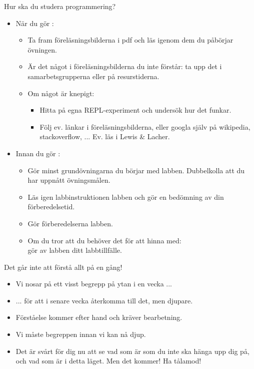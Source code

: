 \begin{SlideExtra}{Hur ska du studera programmering?}
\begin{itemize}
\item När du gör :
\begin{itemize}
\item Ta fram föreläsningsbilderna i pdf och läs igenom dem  du påbörjar övningen.
\item Är det något i föreläsningsbilderna du inte förstår: ta upp det i samarbetsgrupperna eller på resurstiderna.
\item Om något är knepigt:
\begin{itemize}
\item Hitta på egna REPL-experiment och undersök hur det funkar.
\item Följ ev. länkar i föreläsningsbilderna, eller googla själv på wikipedia, stackoverflow, ... Ev. läs i Lewis \& Lacher.
\end{itemize}
\end{itemize}

\item Innan du gör :
\begin{itemize}
\item Gör minst grundövningarna  du börjar med labben. Dubbelkolla att du har uppnått övningsmålen.
\item Läs igen  labbinstruktionen  labben och gör en bedömning av din förberedelsetid.
\item Gör förberedelserna  labben.
\item Om du tror att du behöver det för att hinna med: \\ gör  av labben  ditt labbtillfälle.
\end{itemize}
\end{itemize}

\end{SlideExtra}

\begin{SlideExtra}{Det går inte att förstå allt på en gång!}
\begin{itemize}
\item Vi nosar på ett visst begrepp på ytan i en vecka ...

\item ... för att i senare vecka återkomma till det, men djupare.

\item Förståelse kommer efter hand och kräver bearbetning.

\item Vi måste  begreppen innan vi kan nå djup.

\item Det är svårt för dig nu att se vad som är  som du inte ska hänga upp dig på, och vad som är  i detta läget. Men det kommer! Ha tålamod!
\end{itemize}

\end{SlideExtra}


